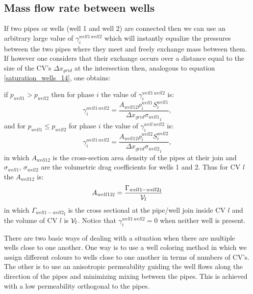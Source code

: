 \subsection{Mass flow rate between wells} 
\label{Mass flow rate between wells}
If two pipes or wells (well 1 and well 2) are connected then we can use an arbitrary large value of 
$\gamma_i^{well1\, well2}$ which will instantly equalize the pressures between the two pipes 
where they meet and freely exchange mass between them. If however one considers that 
their exchange occurs over a distance equal to the size of the CV's ${\Delta x}_{grid}$ at the intersection then, 
analogous to equation \ref{saturation_wells_14}, one obtains: 

\par\noindent
if $p_{well1}>p_{well2}$ then for phase $i$ the value of $\gamma_i^{well1\, well2}$ is: 
\begin{equation}
\gamma_{i}^{well1\, well2}=\frac{A_{well12}  \rho_i^{well1} S_i^{well1} }{{{\Delta x}_{grid}\sigma_{well1}}_i},
\label{saturation_wells_11}
\end{equation}
and for $p_{well1}\leq p_{well2}$ for phase $i$ the value of $\gamma_i^{well\, well2}$ is:
\begin{equation}
\gamma_{i}^{well1\, well2}=\frac{A_{well12}  \rho_i^{well2} S_i^{well2} }{{{\Delta x}_{grid}\sigma_{well2}}_i} ,
\label{saturation_wells_12}
\end{equation}
in which $A_{well12}$ is the cross-section area density of the pipes at their join and $\sigma_{well1}$,  $\sigma_{well2}$ 
are the volumetric drag coefficients for wells 1 and 2.  Thus for CV $l$ the $A_{well12}$ is:
\begin{equation}
{A_{well12}}_l =  \frac{  {\Gamma_{well1-well2}}_l  }{ {\cal V}_l }
\label{saturation_wells_12b}
\end{equation}
in which ${\Gamma_{well1-well2}}_l$ is the cross sectional at the pipe/well join inside CV $l$ 
and the volume of CV $l$ is ${\cal V}_l$. Notice that $\gamma_i^{well1 \, well2}=0$ when 
neither well is present. 

There are two basic ways of dealing with a situation when there are multiple wells close to one 
another. One way is to use a well coloring method in which we assign different colours to wells  
close to one another in terms of numbers of CV's. The other is to use an anisotropic permeability 
guiding the well flows along the direction of the pipes and minimizing mixing between the 
pipes. This is achieved with a low permeability orthogonal to the pipes. 



